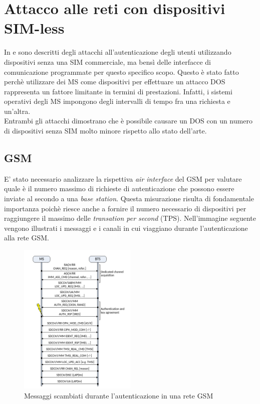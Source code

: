 \clearpage

\section{Attacco alle reti con dispositivi SIM-less}
In \cite{umts-dos} e \cite{gsm-dos-simless} sono descritti degli attacchi all'autenticazione degli utenti utilizzando dispositivi senza una SIM commerciale, ma bensì delle interfacce di comunicazione 
programmate per questo specifico scopo. Questo è stato fatto perchè utilizzare dei MS come dispositivi per effettuare un attacco DOS rappresenta un fattore limitante in termini di prestazioni. Infatti, 
i sistemi operativi degli MS impongono degli intervalli di tempo fra una richiesta e un'altra.\\
Entrambi gli attacchi dimostrano che è possibile causare un DOS con un numero di dispositivi senza SIM molto minore rispetto allo stato dell'arte. 
\subsection{GSM}
E' stato necessario analizzare la rispettiva \textit{air interface} del GSM per valutare quale è il numero massimo di richieste di autenticazione 
che possono essere inviate al secondo a una \textit{base station}. Questa misurazione risulta di fondamentale importanza poichè riesce anche a fornire il numero necessario 
di dispositivi per raggiungere il massimo delle \textit{transation per second} (TPS).
Nell'immagine seguente vengono illustrati i messaggi e i canali in cui viaggiano durante l'autenticazione alla rete GSM.
\begin{figure}[h]
    \centering
    \includegraphics[width=0.5\textwidth]{images/gsm-air-channel.png}
    \caption{Messaggi scambiati durante l'autenticazione in una rete GSM\cite{gsm-dos-simless}}
\end{figure}


